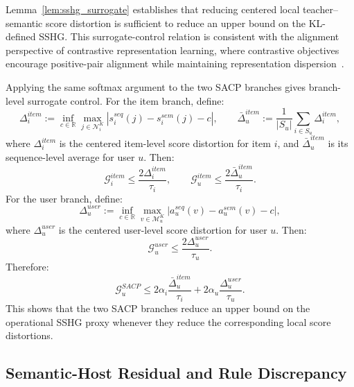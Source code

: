 ﻿\documentclass{article}
\begin{document}
Lemma~\ref{lem:sshg_surrogate} establishes that reducing centered local teacher--semantic score distortion is sufficient to reduce an upper bound on the KL-defined SSHG. This surrogate-control relation is consistent with the alignment perspective of contrastive representation learning, where contrastive objectives encourage positive-pair alignment while maintaining representation dispersion~\cite{wang2020alignment}.

Applying the same softmax argument to the two SACP branches gives branch-level surrogate control. For the item branch, define:
\begin{equation}
\Delta_i^{item}
:=
\inf_{c\in\mathbb R}
\max_{j\in\mathcal N_i^K}
\left|s_i^{seq}(j)-s_i^{sem}(j)-c\right|,
\qquad
\bar\Delta_u^{item}
:=
\frac1{|S_u|}\sum_{i\in S_u}\Delta_i^{item},
\label{eq:item_delta}
\end{equation}
where $\Delta_i^{item}$ is the centered item-level score distortion for item $i$, and $\bar\Delta_u^{item}$ is its sequence-level average for user $u$. Then:
\begin{equation}
\mathcal G_i^{item}\le \frac{2\Delta_i^{item}}{\tau_i},
\qquad
\mathcal G_u^{item}\le \frac{2\bar\Delta_u^{item}}{\tau_i}.
\label{eq:item_delta_bound}
\end{equation}
For the user branch, define:
\begin{equation}
\Delta_u^{user}
:=
\inf_{c\in\mathbb R}
\max_{v\in\mathcal M_u^K}
\left|a_u^{seq}(v)-a_u^{sem}(v)-c\right|,
\label{eq:user_delta}
\end{equation}
where $\Delta_u^{user}$ is the centered user-level score distortion for user $u$. Then:
\begin{equation}
\mathcal G_u^{user}\le \frac{2\Delta_u^{user}}{\tau_u}.
\label{eq:user_delta_bound}
\end{equation}
Therefore:
\begin{equation}
\mathcal G_u^{SACP}
\le
2\alpha_i\frac{\bar\Delta_u^{item}}{\tau_i}
+
2\alpha_u\frac{\Delta_u^{user}}{\tau_u}.
\label{eq:sacp_delta_bound}
\end{equation}
This shows that the two SACP branches reduce an upper bound on the operational SSHG proxy whenever they reduce the corresponding local score distortions.

\subsection{Semantic-Host Residual and Rule Discrepancy}
\label{app:theory_host_residual}
\end{document}
